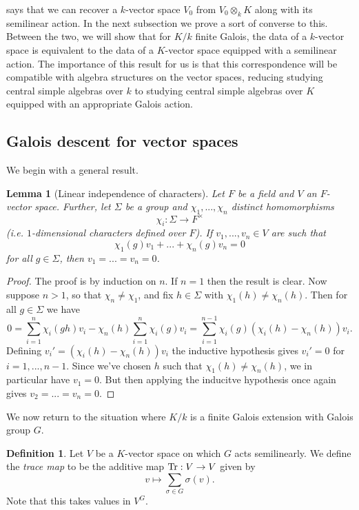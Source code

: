 \documentclass[11pt]{amsart}
\numberwithin{equation}{section}
\newtheorem{lemma}[equation]{Lemma}
\theoremstyle{remark}
\theoremstyle{remark}
\theoremstyle{remark}
\theoremstyle{definition}
\theoremstyle{definition}
\theoremstyle{definition}
\newtheorem{defi}[equation]{Definition}
\theoremstyle{definition}
\theoremstyle{definition}
\theoremstyle{definition}
\begin{document}
 says that we can recover a $k$-vector space $V_0$ from $V_0\otimes_k K$ along with its semilinear action. In the next subsection we prove a sort of converse to this. Between the two, we will show that for $K/k$ finite Galois, the data of a $k$-vector space is equivalent to the data of a $K$-vector space equipped with a semilinear action. The importance of this result for us is that this correspondence will be compatible with algebra structures on the vector spaces, reducing studying central simple algebras over $k$ to studying central simple algebras over $K$ equipped with an appropriate Galois action.

\subsection{Galois descent for vector spaces}


We begin with a general result. 

\begin{lemma}[Linear independence of characters] \label{independence of characters}
Let $F$ be a field and $V$ an $F$-vector space. Further, let $\Sigma$ be a group and $\chi_1,...,\chi_n$ distinct homomorphisms 
\[\chi_i:\Sigma\rightarrow F^\times\]
(i.e. $1$-dimensional characters defined over $F$). 
If $v_1,...,v_n\in V$ are such that 
\[\chi_1(g)v_1+...+\chi_n(g)v_n=0\]
for all $g\in \Sigma$, then $v_1=...=v_n=0$.
\end{lemma}

\begin{proof}
The proof is by induction on $n$. If $n=1$ then the result is clear. Now suppose $n>1$, so that $\chi_n\neq \chi_1$, and fix $h\in \Sigma$ with $\chi_1(h)\neq \chi_n(h)$. Then for all $g\in \Sigma$ we have
\[0=\sum_{i=1}^n\chi_i(gh)v_i-\chi_n(h)\sum_{i=1}^n\chi_i(g)v_i=\sum_{i=1}^{n-1}\chi_i(g)\left(\chi_i(h)-\chi_n(h)\right)v_i.\]
Defining $v_i'=\left(\chi_i(h)-\chi_n(h)\right)v_i$ the inductive hypothesis gives $v_i'=0$ for $i=1,...,n-1$. Since we've chosen $h$ such that $\chi_1(h)\neq \chi_n(h)$, we in particular have $v_1=0$. But then applying the inducitve hypothesis once again gives $v_2=...=v_n=0$.
\end{proof}

We now return to the situation where $K/k$ is a finite Galois extension with Galois group $G$.

\begin{defi}
Let $V$ be a $K$-vector space on which $G$ acts semilinearly.
We define the \textit{trace map} to be the additive map $\textup{Tr}:V\rightarrow V$ given by
\[v\mapsto \sum_{\sigma\in G}\sigma(v).\]
Note that this takes values in $V^G$.
\end{defi}
\end{document}
